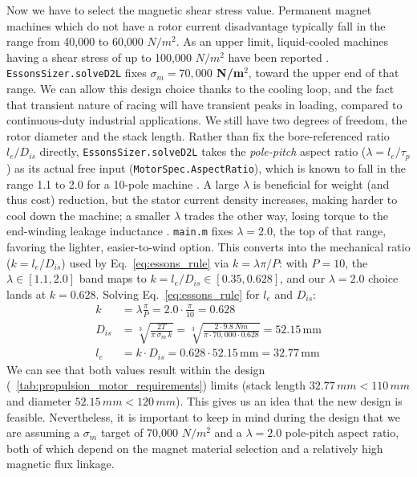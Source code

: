 \documentclass[10pt,final,journal,a4paper,oneside,twocolumn]{IEEEtran}
\begin{document}
Now we have to select the magnetic shear stress value. Permanent magnet machines which do not have a rotor current disadvantage typically fall in the range from 40,000 to 60,000 $N/m^2$. As an upper limit, liquid-cooled machines having a shear stress of up to 100,000 $N/m^2$ have been reported \cite{Lipo2017}.
\texttt{EssonsSizer.solveD2L} fixes \textbf{$\sigma_m = 70,000$ N/m$^2$}, toward the upper end of that range. We can allow this design choice thanks to the cooling loop, and the fact that transient nature of racing will have transient peaks in loading, compared to continuous-duty industrial applications.
We still have two degrees of freedom, the rotor diameter and the stack length. Rather than fix the bore-referenced ratio $l_e/D_{is}$ directly, \texttt{EssonsSizer.solveD2L} takes the \emph{pole-pitch} aspect ratio ($\lambda = l_e/\tau_p$) as its actual free input (\texttt{MotorSpec.AspectRatio}), which is known to fall in the range 1.1 to 2.0 for a 10-pole machine \cite{Lipo2017}. A large $\lambda$ is beneficial for weight (and thus cost) reduction, but the stator current density increases, making harder to cool down the machine; a smaller $\lambda$ trades the other way, losing torque to the end-winding leakage inductance \cite{LucaLecture6}. \texttt{main.m} fixes $\lambda=2.0$, the top of that range, favoring the lighter, easier-to-wind option. This converts into the mechanical ratio ($k = l_e/D_{is}$) used by Eq.~\ref{eq:essons_rule} via $k = \lambda\pi/P$: with $P=10$, the $\lambda\in[1.1,2.0]$ band maps to $k=l_e/D_{is}\in[0.35,0.628]$, and our $\lambda=2.0$ choice lands at $k=0.628$. Solving Eq.~\ref{eq:essons_rule} for $l_e$ and $D_{is}$:
\begin{align*}
k &= \lambda\frac{\pi}{P} = 2.0\cdot\frac{\pi}{10} = 0.628 \\
D_{is} &= \sqrt[3]{\frac{2T}{\pi\,\sigma_m\, k}} = \sqrt[3]{\frac{2\cdot 9.8\,Nm}{\pi\cdot 70{,}000\cdot 0.628}} = 52.15\,\text{mm} \\
l_e &= k\cdot D_{is} = 0.628\cdot 52.15\,\text{mm} = 32.77\,\text{mm}
\end{align*}
We can see that both values result within the design (\tablename~\ref{tab:propulsion_motor_requirements}) limits (stack length $32.77\,mm < 110\,mm$ and diameter $52.15\,mm < 120\,mm$). This gives us an idea that the new design is feasible. Nevertheless, it is important to keep in mind during the design that we are assuming a $\sigma_m$ target of 70,000 $N/m^2$ and a $\lambda=2.0$ pole-pitch aspect ratio, both of which depend on the magnet material selection and a relatively high magnetic flux linkage.
\end{document}
